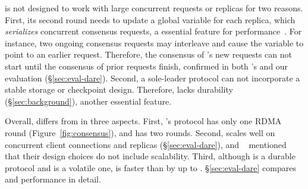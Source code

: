 

\dare is not designed to work with large concurrent requests or 
replicas for two reasons. First, its second round needs to update a global 
variable for each replica, which \emph{serializes} concurrent consensus 
requests, a essential feature for \paxos performance~\cite{paxos:practical}. 
For instance, two ongoing \dare consensus requests may interleave and cause the 
variable to point to an earlier request. Therefore, the consensus of \dare's 
new requests can not start until the consensus of prior requests finish, 
confirmed in both \dare's and our evaluation (\S\ref{sec:eval-dare}). Second, a 
sole-leader protocol can not incorporate a stable storage or 
checkpoint design. Therefore, \dare lacks durability 
(\S\ref{sec:background}), another essential \paxos feature.



Overall, \xxx differs from \dare in three aspects. First, \xxx's protocol has 
only one RDMA round (Figure~\ref{fig:consensus}), and \dare has two rounds. 
Second, \xxx scales well on concurrent client connections and replicas 
(\S\ref{sec:eval-dare}), and \dare~\cite{dare:hpdc15} mentioned that their 
design choices do not include scalability. Third, although \xxx is a durable 
protocol and \dare is a volatile one, \xxx is faster than \dare by up to 
\fasterDARE. \S\ref{sec:eval-dare} compares \xxx and \dare performance in 
detail.

